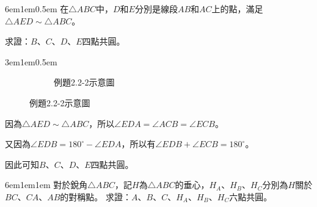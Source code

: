 \documentclass[12pt]{article}
\begin{document}
\begin{mybox}[例題\thesubsection-2]{6em}{1em}{0.5em}
    在$\triangle{ABC}$中，$D$和$E$分別是線段$AB$和$AC$上的點，滿足$\triangle{AED}\sim\triangle{ABC}$。

    求證：$B$、$C$、$D$、$E$四點共圓。
\end{mybox}
\begin{mybox}[解]{3em}{1em}{0.5em}
    \begin{figure}[H]
        \begin{subfigure}[b]{\textwidth}
            \centering
            \label{fig:Angle_s2.2-6}
            \caption{例題2.2-2示意圖}
        \end{subfigure}              
    \end{figure}
    因為$\triangle{AED}\sim\triangle{ABC}$，所以$\angle{EDA}=\angle{ACB}=\angle{ECB}$。

    又因為$\angle{EDB}=180^{\circ}-\angle{EDA}$，所以有$\angle{EDB}+\angle{ECB}=180^{\circ}$。

    因此可知$B$、$C$、$D$、$E$四點共圓。
\end{mybox}
\begin{mybox}[例題\thesubsection-3]{6em}{1em}{1em}
    對於銳角$\triangle{ABC}$，記$H$為$\triangle{ABC}$的垂心，$H_A$、$H_B$、$H_C$分別為$H$關於$BC$、$CA$、$AB$的對稱點。
    求證：$A$、$B$、$C$、$H_A$、$H_B$、$H_C$六點共圓。
\end{mybox}
\end{document}
